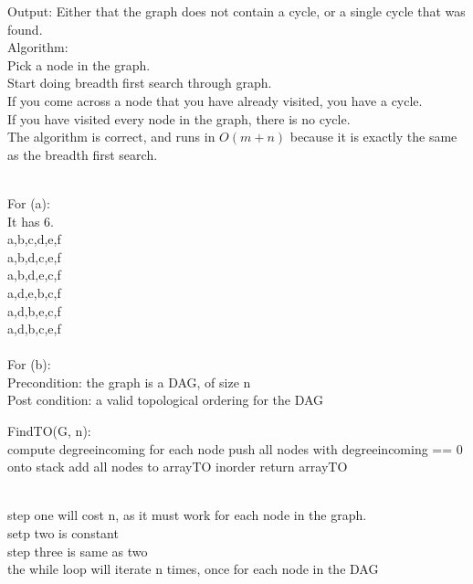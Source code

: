 \documentclass{assignment}
\begin{document}
\begin{problemlist}
\begin{answer}
Output: Either that the graph does not contain a cycle, or a single cycle that was found.\\
Algorithm:\\
Pick a node in the graph.\\
Start doing breadth first search through graph.\\
If you come across a node that you have already visited, you have a cycle.\\
If you have visited every node in the graph, there is no cycle.\\
The algorithm is correct, and runs in $O(m+n)$ because it is exactly the same as the breadth first search.\\
\end{answer}
\clearpage
\pbitem
\begin{problem}
\end{problem}
\begin{answer}
\\
For (a):\\
It has 6.\\
a,b,c,d,e,f\\
a,b,d,c,e,f\\
a,b,d,e,c,f\\
a,d,e,b,c,f\\
a,d,b,e,c,f\\
a,d,b,c,e,f\\
\\For (b):\\
Precondition: the graph is a DAG, of size n\\
Post condition: a valid topological ordering for the DAG\\
\begin{algorithm}
  FindTO(G, n):\\{
    compute degreeincoming for each node\;
    push all nodes with degreeincoming == 0 onto stack\;
    add all nodes to arrayTO inorder\;
    return arrayTO\;
  }
\end{algorithm}
\\
step one will cost n, as it must work for each node in the graph.\\
setp two is constant\\
step three is same as two\\
the while loop will iterate n times, once for each node in the DAG\\

\end{answer}
\end{problemlist}
\end{document}
